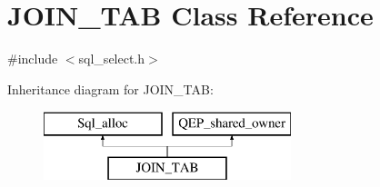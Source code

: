 \hypertarget{classJOIN__TAB}{}\section{J\+O\+I\+N\+\_\+\+T\+AB Class Reference}
\label{classJOIN__TAB}


{\ttfamily \#include $<$sql\+\_\+select.\+h$>$}

Inheritance diagram for J\+O\+I\+N\+\_\+\+T\+AB\+:\begin{figure}[H]
\begin{center}
\leavevmode
\includegraphics[height=2.000000cm]{classJOIN__TAB}
\end{center}
\end{figure}
